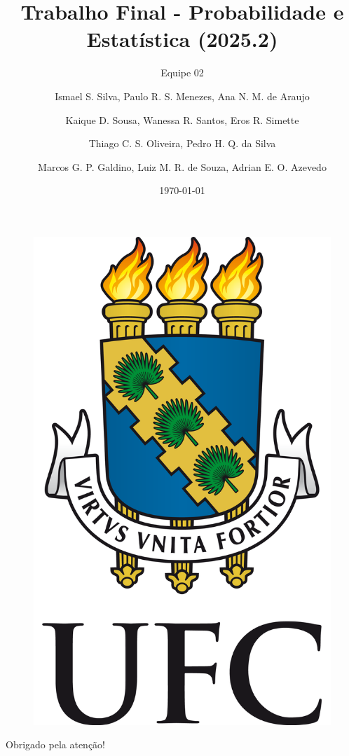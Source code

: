 \documentclass[serif, aspectratio=169]{beamer}
\title{Trabalho Final - Probabilidade e Estatística (2025.2)}
\subtitle{Equipe 02}
\author{
Ismael S. Silva, Paulo R. S. Menezes, Ana N. M. de Araujo\and
Kaique D. Sousa, Wanessa R. Santos, Eros R. Simette\and
Thiago C. S. Oliveira, Pedro H. Q. da Silva\and
Marcos G. P. Galdino, Luiz M. R. de Souza, Adrian E. O. Azevedo
}
\institute{Universidade Federal do Ceará (UFC)}
\date{\small \today}
\begin{document}
\begin{frame}
    \titlepage
    \vspace*{-0.6cm}
    \begin{figure}[htpb]
        \begin{center}
            \includegraphics[keepaspectratio, scale=0.06]{figures/UFC.png}
        \end{center}
    \end{figure}
\end{frame}

\begin{frame}    
\tableofcontents[sectionstyle=show,
subsectionstyle=show/shaded/hide,
subsubsectionstyle=show/shaded/hide]
\end{frame}







\begin{frame}
\begin{center}
{\Huge Obrigado pela atenção!}
\vspace{1cm}

\end{center}
\end{frame}
\end{document}
